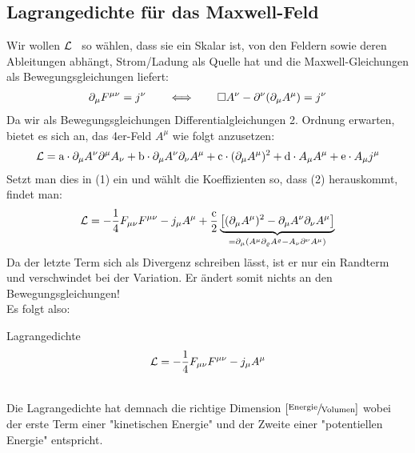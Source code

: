 \subsection{Lagrangedichte für das Maxwell-Feld}
Wir wollen $\mathcal{L}$ \ so wählen, dass sie ein Skalar ist, von den Feldern sowie deren Ableitungen abhängt, Strom/Ladung als Quelle hat und die Maxwell-Gleichungen als Bewegungsgleichungen liefert:
\begin{align}
\partial_{\mu}F^{\mu \nu} = j^{\nu} \qquad  \Longleftrightarrow \qquad \Box A^{\nu} - \partial^{\nu}(\partial_{\mu}A^{\mu}) = j^{\nu}
\end{align}
Da wir als Bewegungsgleichungen Differentialgleichungen 2. Ordnung erwarten, bietet es sich an, das 4er-Feld $A^{\mu}$ wie folgt anzusetzen:
\begin{align*}
\mathcal{L} = \text{a} \cdot \partial_{\mu}A^{\nu}\partial^{\mu}A_{\nu} + \text{b} \cdot \partial_{\mu}A^{\nu}\partial_{\nu}A^{\mu} + \text{c} \cdot (\partial_{\mu}A^{\mu})^2 + \text{d} \cdot A_{\mu}A^{\mu} + \text{e} \cdot A_{\mu}j^{\mu}
\end{align*}
Setzt man dies in (1) ein und wählt die Koeffizienten so, dass (2) herauskommt, findet man:
\begin{align*}
\mathcal{L} = -\frac{1}{4} F_{\mu \nu} F^{\mu \nu} - j_{\mu}A^{\mu} + \frac{\text{c}}{2} \underbrace{\left[ (\partial_{\mu}A^{\mu})^2 - \partial_{\mu}A^{\nu}\partial_{\nu}A^{\mu} \right]}_{= \partial_{\mu}(A^{\mu}\partial_{\varrho}A^{\varrho}-A_{\nu}\partial^{\nu}A^{\mu})}
\end{align*}
Da der letzte Term sich als Divergenz schreiben lässt, ist er nur ein Randterm und verschwindet bei der Variation. Er ändert somit nichts an den Bewegungsgleichungen! \\ 
Es folgt also:
\begin{mybox}{Lagrangedichte}
\begin{align}
\mathcal{L} = -\frac{1}{4} F_{\mu \nu} F^{\mu \nu} - j_{\mu}A^{\mu}
\end{align}
\end{mybox}
\phantom{.} \\
Die Lagrangedichte hat demnach die richtige Dimension $\left[\sfrac{\text{Energie}}{\text{Volumen}}\right]$ wobei der erste Term einer "kinetischen Energie" und der Zweite einer "potentiellen Energie" entspricht. \\


